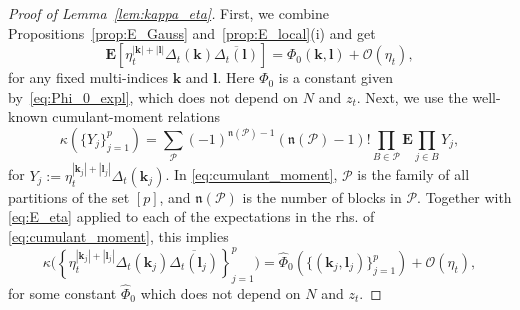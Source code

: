 \documentclass[10pt]{amsart}
\numberwithin{equation}{section}
\newcommand{\E}{\mathbf{E}}
\begin{document}
\begin{proof}[Proof of Lemma~\ref{lem:kappa_eta}] First, we combine Propositions~\ref{prop:E_Gauss} and~\ref{prop:E_local}(i) and get
\begin{equation}
\E \left[\eta_t^{|\bm{k}|+|\bm{l}|}\Delta_t(\bm{k}) \overline{\Delta_t(\bm{l})}\right] = \Phi_0(\bm{k},\bm{l}) + \mathcal{O}(\eta_t),
\label{eq:E_eta}
\end{equation}
for any fixed multi-indices $\bm{k}$ and $\bm{l}$. Here $\Phi_0$ is a constant given by~\eqref{eq:Phi_0_expl}, which does not depend on $N$ and $z_t$. Next, we use the well-known cumulant-moment relations
\begin{equation}
\kappa\left(\{Y_j\}_{j=1}^p\right) = \sum_{\mathcal{P}} (-1)^{\mathfrak{n}(\mathcal{P})-1}(\mathfrak{n}(\mathcal{P})-1)! \prod_{B\in \mathcal{P}} \E \prod_{j\in B} Y_j,
\label{eq:cumulant_moment}
\end{equation}
for $Y_j:=\eta_t^{|\bm{k}_j|+|\bm{l}_j|}\Delta_t(\bm{k}_j)$. In \eqref{eq:cumulant_moment}, $\mathcal{P}$ is the family of all partitions of the set $[p]$, and $\mathfrak{n}(\mathcal{P})$ is the number of blocks in $\mathcal{P}$. Together with \eqref{eq:E_eta} applied to each of the expectations in the rhs. of \eqref{eq:cumulant_moment}, this implies 
\begin{equation}
\kappa\Big(\left\lbrace \eta_t^{|\bm{k}_j|+|\bm{l}_j|}\Delta_t(\bm{k}_j)\overline{\Delta_t(\bm{l}_j)}\right\rbrace_{j=1}^p\Big) = \widehat{\Phi}_0\left(\{(\bm{k}_j,\bm{l}_j)\}_{j=1}^p\right) + \mathcal{O}(\eta_t),
\label{eq:kappa_Phi}
\end{equation}
for some constant $\widehat{\Phi}_0$ which does not depend on $N$ and $z_t$. 


\end{proof}
\end{document}
